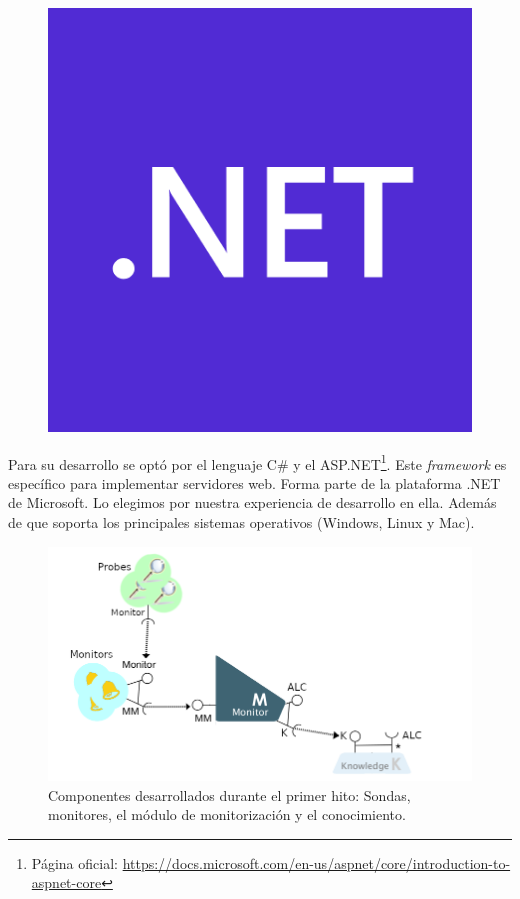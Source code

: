 \begin{figure}
  \vspace{-15pt}
  \includegraphics[scale=0.145]{cap_implementacion/images/dotnet-logo}
  \centering
\end{figure}

Para su desarrollo se optó por el lenguaje C\# y el  ASP.NET\footnote{Página oficial: \url{https://docs.microsoft.com/en-us/aspnet/core/introduction-to-aspnet-core}}. Este \emph{framework} es específico para implementar servidores web. Forma parte de la plataforma .NET de Microsoft. Lo elegimos por nuestra experiencia de desarrollo en ella. Además de que soporta los principales sistemas operativos (Windows, Linux y Mac).

\begin{figure}[h!]
  \centering
  \includegraphics[scale=0.5]{cap_implementacion/images/hito-1-monitorizacion}
  \caption{Componentes desarrollados durante el primer hito: Sondas, monitores, el módulo de monitorización y el conocimiento.}
  \label{fig:hito-1-monitorizacion}
\end{figure}

